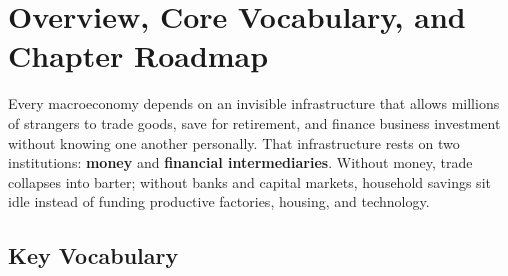 \documentclass[11pt, oneside]{book}
\begin{document}
\section{Overview, Core Vocabulary, and Chapter Roadmap}

Every macroeconomy depends on an invisible infrastructure that allows millions of strangers to trade goods, save for retirement, and finance business investment without knowing one another personally. That infrastructure rests on two institutions: \textbf{money} and \textbf{financial intermediaries}. Without money, trade collapses into barter; without banks and capital markets, household savings sit idle instead of funding productive factories, housing, and technology.

\subsection*{Key Vocabulary}
\end{document}
